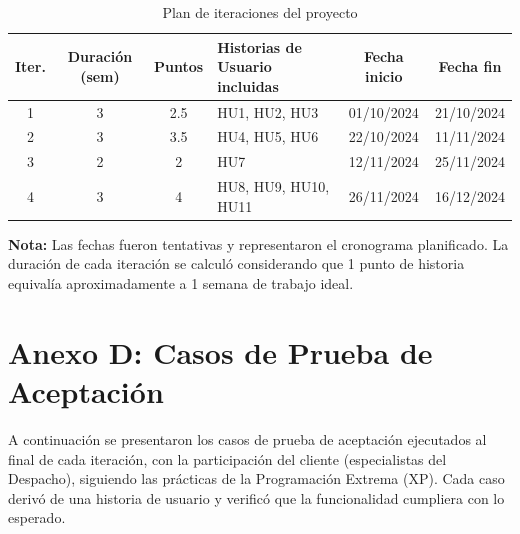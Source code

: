\begin{table}[H]
\centering
\caption{Plan de iteraciones del proyecto}
\label{tab:plan_iteraciones}
\footnotesize
\begin{tabular}{|c|c|c|p{6cm}|c|c|}
\hline
\textbf{Iter.} & \textbf{Duración (sem)} & \textbf{Puntos} & \textbf{Historias de Usuario incluidas} & \textbf{Fecha inicio} & \textbf{Fecha fin} \\
\hline
1 & 3 & 2.5 & HU1, HU2, HU3 & 01/10/2024 & 21/10/2024 \\
\hline
2 & 3 & 3.5 & HU4, HU5, HU6 & 22/10/2024 & 11/11/2024 \\
\hline
3 & 2 & 2   & HU7 & 12/11/2024 & 25/11/2024 \\
\hline
4 & 3 & 4   & HU8, HU9, HU10, HU11 & 26/11/2024 & 16/12/2024 \\
\hline
\end{tabular}
\end{table}

\textbf{Nota:} Las fechas fueron tentativas y representaron el cronograma planificado. La duración de cada iteración se calculó considerando que 1 punto de historia equivalía aproximadamente a 1 semana de trabajo ideal.

\section*{Anexo D: Casos de Prueba de Aceptación}

A continuación se presentaron los casos de prueba de aceptación ejecutados al final de cada iteración, con la participación del cliente (especialistas del Despacho), siguiendo las prácticas de la Programación Extrema (XP). Cada caso derivó de una historia de usuario y verificó que la funcionalidad cumpliera con lo esperado.

